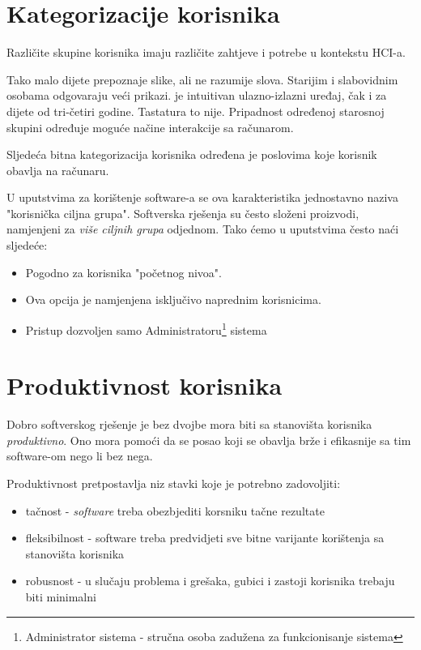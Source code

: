 \documentclass[times, utf8, seminar]{fit}
\begin{document}
\section{Kategorizacije korisnika}

Različite skupine korisnika imaju različite zahtjeve i potrebe u kontekstu HCI-a. 

Tako malo dijete prepoznaje slike, ali ne razumije slova. Starijim i slabovidnim osobama odgovaraju veći prikazi.  je intuitivan ulazno-izlazni uređaj, čak i za dijete od tri-četiri godine. Tastatura to nije. Pripadnost određenoj starosnoj skupini određuje moguće načine interakcije sa računarom.

Sljedeća bitna kategorizacija korisnika određena je poslovima koje korisnik obavlja na računaru. 

U uputstvima za korištenje software-a se ova karakteristika jednostavno naziva "korisnička ciljna grupa". Softverska rješenja su često složeni proizvodi, namjenjeni za \emph{više ciljnih grupa} odjednom. Tako ćemo u uputstvima često naći sljedeće:
\begin{itemize}
  \item Pogodno za korisnika "početnog nivoa".
  \item Ova opcija je namjenjena isključivo naprednim korisnicima.
  \item Pristup dozvoljen samo Administratoru\footnote{Administrator sistema - stručna osoba zadužena za funkcionisanje sistema} sistema
\end{itemize}

\section{Produktivnost korisnika}

Dobro softverskog rješenje je bez dvojbe mora biti sa stanovišta korisnika \emph{produktivno}. Ono mora pomoći da se posao koji se obavlja brže i efikasnije sa tim software-om nego li bez nega.

Produktivnost pretpostavlja niz stavki koje je potrebno zadovoljiti:
\begin{itemize}
  \item tačnost - \emph{software} treba obezbjediti korsniku tačne rezultate
  \item fleksibilnost - software treba predvidjeti sve bitne varijante korištenja sa stanovišta korisnika
  \item robusnost - u slučaju problema i grešaka, gubici i zastoji korisnika trebaju biti minimalni
\end{itemize}
\end{document}
